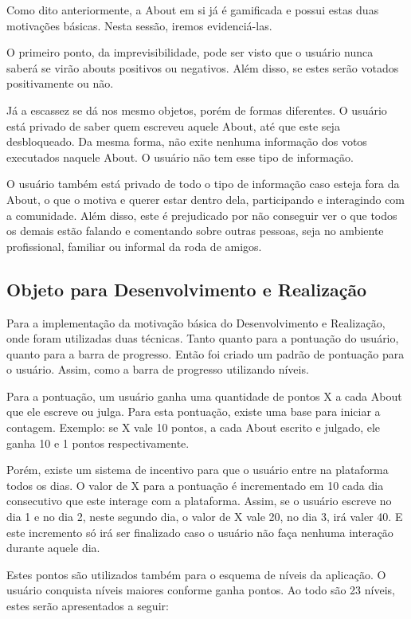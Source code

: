 Como dito anteriormente, a About em si já é gamificada e possui estas duas motivações básicas. 
Nesta sessão, iremos evidenciá-las. 

O primeiro ponto, da imprevisibilidade, pode ser visto que o usuário nunca saberá se virão
abouts positivos ou negativos. Além disso, se estes serão votados positivamente ou não. 

Já a escassez se dá nos mesmo objetos, porém de formas diferentes. O usuário está privado
de saber quem escreveu aquele About, até que este seja desbloqueado. Da mesma forma, não exite
nenhuma informação dos votos executados naquele About. O usuário não tem esse tipo de informação.

O usuário também está privado de todo o tipo de informação caso esteja fora da About, o que o motiva
e querer estar dentro dela, participando e interagindo com a comunidade. Além disso, este é prejudicado
por não  conseguir ver o que todos os demais estão falando e comentando sobre outras pessoas, seja no
ambiente profissional, familiar ou informal da roda de amigos.

\subsection{Objeto para Desenvolvimento e Realização}
\label{sub:objeto_desenvolvimento_e_realizacao}
Para a implementação da motivação básica do Desenvolvimento e Realização, onde foram utilizadas duas técnicas.
Tanto quanto para a pontuação do usuário, quanto para a barra de progresso. Então foi criado um padrão de pontuação para
o usuário. Assim, como a barra de progresso utilizando níveis.

Para a pontuação, um usuário ganha uma quantidade de pontos X a cada About que ele escreve ou julga.
Para esta pontuação, existe uma base para iniciar a contagem. Exemplo: se X vale 10 pontos, a cada About escrito e
julgado, ele ganha 10 e 1 pontos respectivamente. 

Porém, existe um sistema de incentivo para que o usuário entre na plataforma todos os dias. O valor de X para a pontuação
é incrementado em 10 cada dia consecutivo que este interage com a plataforma. Assim, se o usuário escreve no dia 1 e no dia 2,
neste segundo dia, o valor de X vale 20, no dia 3, irá valer 40. E este incremento só irá ser finalizado
caso o usuário não faça nenhuma interação durante aquele dia.

Estes pontos são utilizados também para o esquema de níveis da aplicação. O usuário conquista níveis maiores
conforme ganha pontos. Ao todo são 23 níveis, estes serão apresentados a seguir:

